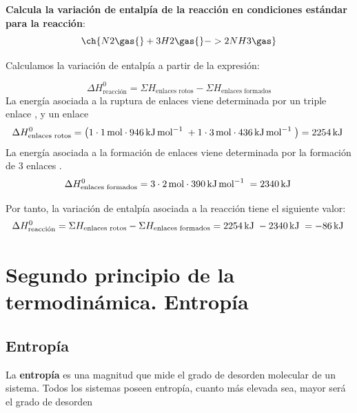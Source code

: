 \begin{example}
    \textbf{Calcula la variación de entalpía de la reacción en condiciones estándar para la reacción}:
    \begin{equation*}
        \ch{N2 \gas{} + 3 H2 \gas{} -> 2 NH3 \gas}
    \end{equation*}

    Calculamos la variación de entalpía a partir de la expresión:

    \begin{equation}
        \Delta H^0_{\text{reacción}} = \Sigma H_{\text{enlaces rotos}} - \Sigma H_{\text{enlaces formados}}
    \end{equation}
    La energía asociada a la ruptura de enlaces viene determinada por un triple enlace , y un enlace 
    \begin{equation*}
        \Delta H^0_{\text{enlaces rotos}} = \left(1\cdot \moles{1}\cdot \energia[kjmol]{946} + 1\cdot \moles{3}\cdot \energia[kjmol]{436} \right) = \energia[kj]{2254}
    \end{equation*}
    La energía asociada a la formación de enlaces viene determinada por la formación de 3 enlaces .
    \begin{equation*}
        \Delta H^0_{\text{enlaces formados}} = 3\cdot \moles{2}\cdot \energia[kjmol]{390}  = \energia[kj]{2340}
    \end{equation*}

    Por tanto, la variación de entalpía asociada a la reacción tiene el siguiente valor:
    \begin{equation*}
        \Delta H^0_{\text{reacción}} = \Sigma H_{\text{enlaces rotos}} - \Sigma H_{\text{enlaces formados}} = \energia[kj]{2254}- \energia[kj]{2340} = \energia[kj]{-86}
    \end{equation*}
\end{example}


\section{Segundo principio de la termodinámica. Entropía}\label{sec:segundo-principio-de-la-termodinamica.-entropia}

\subsection{Entropía}\label{subsec:entropia}


\begin{definition}[Entrop\'ia]
    La \textbf{entropía} es una magnitud que mide el grado de desorden molecular de un sistema.
    Todos los sistemas poseen entropía, cuanto más elevada sea, mayor será el grado de desorden
\end{definition}


